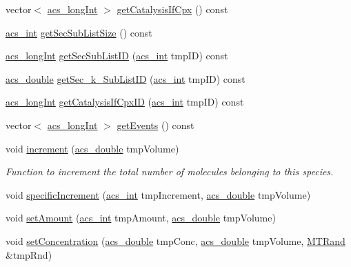 \begin{DoxyCompactItemize}
\item 
vector$<$ \hyperlink{a00024_a19319d75f02db4308bc5c0026d98cd85}{acs\-\_\-long\-Int} $>$ \hyperlink{a00022_aaafd2738231ba916153e24c19e7b3bfc}{get\-Catalysis\-If\-Cpx} () const 
\item 
\hyperlink{a00024_a8d277355641a098190360234e2ebde35}{acs\-\_\-int} \hyperlink{a00022_a984df86838272204e7a8414bbc2a61fb}{get\-Sec\-Sub\-List\-Size} () const 
\item 
\hyperlink{a00024_a19319d75f02db4308bc5c0026d98cd85}{acs\-\_\-long\-Int} \hyperlink{a00022_a214be9ae628e99e47dfd9d72c8c07933}{get\-Sec\-Sub\-List\-I\-D} (\hyperlink{a00024_a8d277355641a098190360234e2ebde35}{acs\-\_\-int} tmp\-I\-D) const 
\item 
\hyperlink{a00024_ab776853a005fcbf56af0424a2a4dd607}{acs\-\_\-double} \hyperlink{a00022_a6c546c89a974434e24f2161867521462}{get\-Sec\-\_\-k\-\_\-\-Sub\-List\-I\-D} (\hyperlink{a00024_a8d277355641a098190360234e2ebde35}{acs\-\_\-int} tmp\-I\-D) const 
\item 
\hyperlink{a00024_a19319d75f02db4308bc5c0026d98cd85}{acs\-\_\-long\-Int} \hyperlink{a00022_aac1880e5779d75ef8c700bee278da15d}{get\-Catalysis\-If\-Cpx\-I\-D} (\hyperlink{a00024_a8d277355641a098190360234e2ebde35}{acs\-\_\-int} tmp\-I\-D) const 
\item 
vector$<$ \hyperlink{a00024_a19319d75f02db4308bc5c0026d98cd85}{acs\-\_\-long\-Int} $>$ \hyperlink{a00022_af261c742c9578875c1001abf191706b7}{get\-Events} () const 
\item 
void \hyperlink{a00022_a77f68017e5c50f8943df90efd2e8a0bb}{increment} (\hyperlink{a00024_ab776853a005fcbf56af0424a2a4dd607}{acs\-\_\-double} tmp\-Volume)
\begin{DoxyCompactList}\small\item\em Function to increment the total number of molecules belonging to this species. \end{DoxyCompactList}\item 
void \hyperlink{a00022_a87e85a2397e5ec34518efa235b529d7e}{specific\-Increment} (\hyperlink{a00024_a8d277355641a098190360234e2ebde35}{acs\-\_\-int} tmp\-Increment, \hyperlink{a00024_ab776853a005fcbf56af0424a2a4dd607}{acs\-\_\-double} tmp\-Volume)
\item 
void \hyperlink{a00022_abefdc30b6f352e5ce5576a610015f5b8}{set\-Amount} (\hyperlink{a00024_a8d277355641a098190360234e2ebde35}{acs\-\_\-int} tmp\-Amount, \hyperlink{a00024_ab776853a005fcbf56af0424a2a4dd607}{acs\-\_\-double} tmp\-Volume)
\item 
void \hyperlink{a00022_a2bba4b93553f189480fddbbe026c975f}{set\-Concentration} (\hyperlink{a00024_ab776853a005fcbf56af0424a2a4dd607}{acs\-\_\-double} tmp\-Conc, \hyperlink{a00024_ab776853a005fcbf56af0424a2a4dd607}{acs\-\_\-double} tmp\-Volume, \hyperlink{a00016}{M\-T\-Rand} \&tmp\-Rnd)

\end{DoxyCompactItemize}
